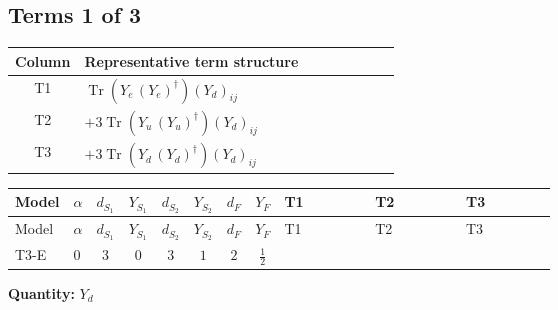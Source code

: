 \documentclass[8pt]{article}
\begin{document}
\begin{landscape}
\subsection*{Terms 1 of 3}
\begin{center}
\begin{tabular}{@{}c >{\raggedright\arraybackslash}p{0.82\linewidth}@{}}
\toprule
Column & Representative term structure \\
\midrule
T1 & \(\displaystyle \operatorname{Tr}\!\left({Y_e}\,\left({Y_e}\right)^{\dagger}\right) \left({Y_d}\right)_{ij}\) \\
\midrule
T2 & \(\displaystyle +3 \operatorname{Tr}\!\left({Y_u}\,\left({Y_u}\right)^{\dagger}\right) \left({Y_d}\right)_{ij}\) \\
\midrule
T3 & \(\displaystyle +3 \operatorname{Tr}\!\left({Y_d}\,\left({Y_d}\right)^{\dagger}\right) \left({Y_d}\right)_{ij}\) \\
\midrule
\bottomrule
\end{tabular}
\end{center}
\smallskip
\tiny
\begin{longtable}{@{}llcccccc >{\raggedright\arraybackslash}p{0.21\linewidth} >{\raggedright\arraybackslash}p{0.21\linewidth} >{\raggedright\arraybackslash}p{0.21\linewidth}@{}}
\toprule
Model & $\alpha$ & $d_{S_1}$ & $Y_{S_1}$ & $d_{S_2}$ & $Y_{S_2}$ & $d_F$ & $Y_F$ & T1 & T2 & T3 \\
\midrule
\endfirsthead
\toprule
Model & $\alpha$ & $d_{S_1}$ & $Y_{S_1}$ & $d_{S_2}$ & $Y_{S_2}$ & $d_F$ & $Y_F$ & T1 & T2 & T3 \\
\midrule
\endhead
T3-E & $0$ & $3$ & $0$ & $3$ & $1$ & $2$ & $\frac{1}{2}$ & \scriptsize\adjustbox{max width=\linewidth}{$\begin{gathered} \operatorname{Tr}\!\left({Y_e}\,\left({Y_e}\right)^{\dagger}\right) \left({Y_d}\right)_{ij}\end{gathered}$} & \scriptsize\adjustbox{max width=\linewidth}{$\begin{gathered} +3 \operatorname{Tr}\!\left({Y_u}\,\left({Y_u}\right)^{\dagger}\right) \left({Y_d}\right)_{ij}\end{gathered}$} & \scriptsize\adjustbox{max width=\linewidth}{$\begin{gathered} +3 \operatorname{Tr}\!\left({Y_d}\,\left({Y_d}\right)^{\dagger}\right) \left({Y_d}\right)_{ij}\end{gathered}$} \\
\midrule
\bottomrule
\end{longtable}
\clearpage
\noindent\textbf{Quantity: }$Y_d$\par\smallskip

\end{landscape}
\end{document}
